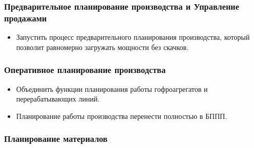 \subsubsection{Предварительное планирование производства и Управление продажами}
\begin{itemize}
\item Запустить процесс предварительного планирования производства, который позволит равномерно загружать мощности без скачков.
\end{itemize}


\subsubsection{Оперативное планирование производства}
\begin{itemize}
\item Объединить функции планирования работы гофроагрегатов и перерабатывающих линий. 
\item Планирование работы производства перенести полностью в БППП.

\end{itemize}

\subsubsection{Планирование материалов}

